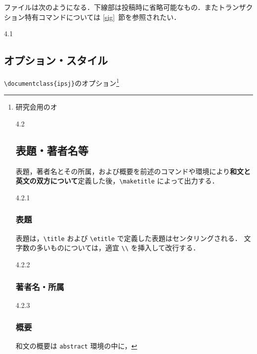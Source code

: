 \documentclass[submit,techrep]{ipsj}
\def\|{\verb|}
\begin{document}
\label{config}

ファイルは次のようになる．下線部は投稿時に省略可能なもの．またトランザク
ション特有コマンドについては \ref{sig}~節を参照されたい．

4.1
\subsection{オプション・スタイル}

\label{option} \|\documentclass{ipsj}|のオプション\footnote{研究会用のオ

4.2
\subsection{表題・著者名等}

表題，著者名とその所属，および概要を前述のコマンドや環境により{\bf 和文と
英文の双方について}定義した後，\|\maketitle| によって出力する．

4.2.1
\subsubsection{表題}

表題は，\|\title| および \|\etitle| で定義した表題はセンタリングされる．
文字数の多いものについては，適宜 \|\\| を挿入して改行する．

4.2.2
\subsubsection{著者名・所属}

4.2.3
\subsubsection{概要}

和文の概要は \|abstract| 環境の中に，




}
\end{document}
